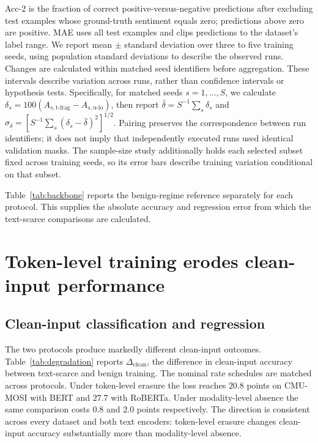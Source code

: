 \documentclass[preprint,11pt]{elsarticle}
\newcommand{\tokenlevel}{token-level}
\newcommand{\modlevel}{modality-level}
\newcommand{\degr}{\ensuremath{\Delta_{\mathrm{clean}}}}  %
\begin{document}
Acc-2 is the fraction of correct positive-versus-negative predictions after
excluding test examples whose ground-truth sentiment equals zero; predictions
above zero are positive. MAE uses all test examples and clips predictions to
the dataset's label range. We report mean $\pm$ standard deviation over three
to five training seeds, using population standard deviations to describe the
observed runs. Changes are calculated within matched seed identifiers before
aggregation. These intervals describe variation across runs, rather than
confidence intervals or hypothesis tests.
Specifically, for matched seeds $s=1,\ldots,S$, we calculate
$\delta_s=100(A_{s,\mathrm{t\text{-}frag}}-A_{s,\mathrm{u\text{-}lo}})$,
then report $\bar\delta=S^{-1}\sum_s\delta_s$ and
$\sigma_\delta=[S^{-1}\sum_s(\delta_s-\bar\delta)^2]^{1/2}$.
Pairing preserves the correspondence between run identifiers; it does not
imply that independently executed runs used identical validation masks.
The sample-size study additionally holds each selected subset fixed across
training seeds, so its error bars describe training variation conditional on
that subset.

Table~\ref{tab:backbone} reports the benign-regime reference separately for
each protocol. This supplies the absolute accuracy and regression error from
which the text-scarce comparisons are calculated.

\begin{table}[t]
\centering
\caption{Clean-input performance under benign missingness training with BERT.
Acc-2 excludes neutral labels; MAE uses all examples. Values are mean $\pm$
standard deviation across five seeds for each dataset and protocol.}
\label{tab:backbone}
\small

\end{table}

\section{Token-level training erodes clean-input performance}\label{sec:granularity}

\subsection{Clean-input classification and regression}

The two protocols produce markedly different clean-input outcomes.
Table~\ref{tab:degradation} reports $\degr$, the difference in clean-input
accuracy between text-scarce and benign training. The nominal rate schedules
are matched across protocols. Under \tokenlevel{} erasure the loss reaches
$20.8$ points on CMU-MOSI with BERT and $27.7$ with RoBERTa. Under \modlevel{}
absence the same comparison costs $0.8$ and $2.0$ points respectively. The
direction is consistent across every dataset and both text encoders:
\tokenlevel{} erasure changes clean-input accuracy substantially more than
\modlevel{} absence.
\end{document}
